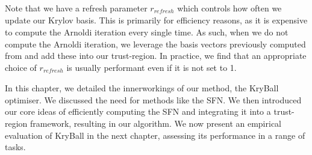 Note that we have a refresh parameter $r_{\mathit{refresh}}$ which controls how often we update our Krylov basis. This is primarily for efficiency reasons, as it is expensive to compute the Arnoldi iteration every single time. As such, when we do not compute the Arnoldi iteration, we leverage the basis vectors previously computed from and add these into our trust-region. In practice, we find that an appropriate choice of $r_{\mathit{refresh}}$ is usually performant even if it is not set to 1. 

In this chapter, we detailed the innerworkings of our method, the KryBall optimiser. We discussed the need for methods like the SFN. We then introduced our core ideas of efficiently computing the SFN and integrating it into a trust-region framework, resulting in our algorithm. We now present an empirical evaluation of KryBall in the next chapter, assessing its performance in a range of tasks.